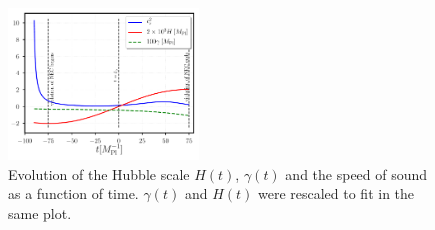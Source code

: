 \documentclass[aps,prd,reprint,twocolumn,showpacs,nofootinbib,superscriptaddress,floatfix]{revtex4-1}
\begin{document}
\begin{figure}
\begin{center}
\includegraphics[width=0.45\textwidth]{full_background.pdf}
\caption{Evolution of the Hubble scale $H(t)$, $\gamma(t)$ and the speed of sound as a function of time. $\gamma(t)$ and $H(t)$ were rescaled to fit in the same plot.}
\label{fig:full_back}
\end{center}
\end{figure}
\end{document}

